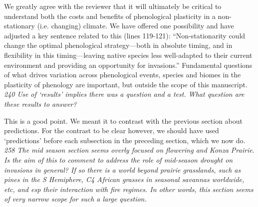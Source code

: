 \documentclass[11pt,a4paper]{letter}
\begin{document}
\begin{letter}{}
We greatly agree with the reviewer that it will ultimately be critical to understand both the costs and benefits of phenological plasticity in a non-stationary (i.e. changing) climate. We have offered one possibility and have adjusted a key sentence related to this (lines 119-121): ``Non-stationarity could change the optimal phenological strategy---both in absolute timing, and in flexibility in this timing---leaving native species less well-adapted to their current environment and providing an opportunity for invasions.'' Fundamental questions of what drives variation across phenological events, species and biomes in the plasticity of phenology are important, but outside the scope of this manuscript.\\

\emph{240 Use of `results' implies there was a question and a test. What question are these results to answer?}

This is a good point. We meant it to contrast with the previous section about predictions. For the contrast to be clear however, we should have used `predictions' before each subsection in the preceding section, which we now do.\\

\emph{258 The mid season section seems overly focused on flowering and Konza Prairie. Is the aim of this to comment to address the role of mid-season drought on invasions in general? If so there is a world beyond prairie grasslands, such as pines in the S Hemiphere, C4 African grasses in seasonal savannas worldwide, etc, and esp their interaction with fire regimes. In other words, this section seems of very narrow scope for such a large question.}


\end{letter}
\end{document}
